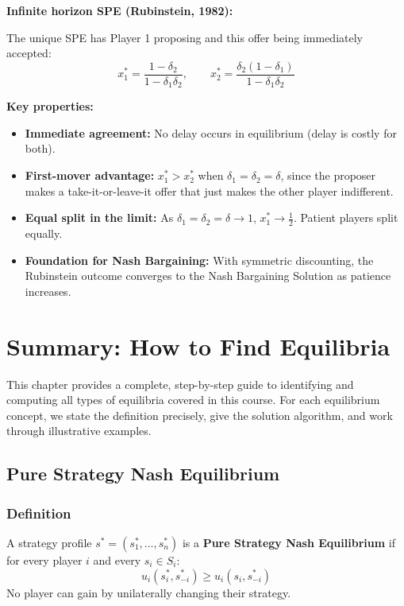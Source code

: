 \documentclass[hidelinks]{article}
\begin{document}
\textbf{Infinite horizon SPE (Rubinstein, 1982):}

The unique SPE has Player 1 proposing and this offer being immediately accepted:
\[
x_1^* = \frac{1 - \delta_2}{1 - \delta_1 \delta_2}, \qquad x_2^* = \frac{\delta_2(1-\delta_1)}{1 - \delta_1 \delta_2}
\]

\textbf{Key properties:}
\begin{itemize}
    \item \textbf{Immediate agreement:} No delay occurs in equilibrium (delay is costly for both).
    \item \textbf{First-mover advantage:} $x_1^* > x_2^*$ when $\delta_1 = \delta_2 = \delta$, since the proposer makes a take-it-or-leave-it offer that just makes the other player indifferent.
    \item \textbf{Equal split in the limit:} As $\delta_1 = \delta_2 = \delta \to 1$, $x_1^* \to \frac{1}{2}$. Patient players split equally.
    \item \textbf{Foundation for Nash Bargaining:} With symmetric discounting, the Rubinstein outcome converges to the Nash Bargaining Solution as patience increases.
\end{itemize}

\newpage
\section{Summary: How to Find Equilibria}

This chapter provides a complete, step-by-step guide to identifying and computing all types of equilibria covered in this course. For each equilibrium concept, we state the definition precisely, give the solution algorithm, and work through illustrative examples.

\subsection{Pure Strategy Nash Equilibrium}

\subsubsection{Definition}

A strategy profile $s^* = (s_1^*, \ldots, s_n^*)$ is a \textbf{Pure Strategy Nash Equilibrium} if for every player $i$ and every $s_i \in S_i$:
\[
u_i(s_i^*, s_{-i}^*) \geq u_i(s_i, s_{-i}^*)
\]
No player can gain by unilaterally changing their strategy.
\end{document}
